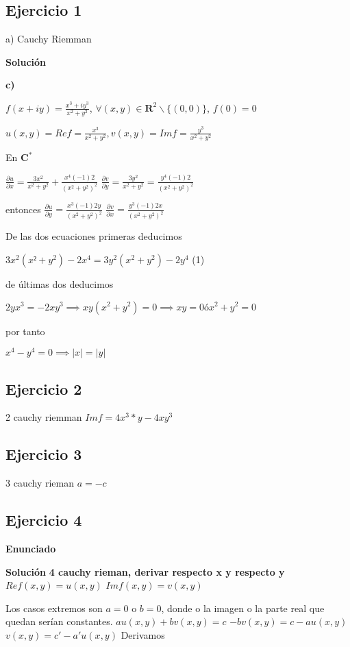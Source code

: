 \subsection{Ejercicio 1}
a) Cauchy Riemman

\textbf{Solución}


\textbf{c)}

$f(x+iy) = \frac{x^3+iy^3}{x^2+y^2}$, $\forall (x,y)\in\mathbf{R}^2 \backslash \{ (0,0) \}$, $f(0)=0$

$u(x,y) = Re f = \frac{x^3}{x^2+y^2}, v(x,y) = Imf = \frac{y^3}{x^2+y^2}$

En $\mathbf{C}^{\ast}$

$ \frac{\partial u}{\partial x} = \frac{3x^2}{x^2+y^2} + \frac{x^4(-1)2}{(x^2+y^2)^2}$
$ \frac{\partial v}{\partial y} = \frac{3y^2}{x^2+y^2} = \frac{y^4(-1)2}{(x^2+y^2)^2}$

entonces
$\frac{\partial u}{\partial y} = \frac{x^3 (-1)2y}{(x^2+y^2)^2}$
$\frac{\partial v}{\partial x} = \frac{y^3(-1)2x}{(x^2+y^2)^2}$

De las dos ecuaciones primeras deducimos

$3x^2(x²+y^2) - 2x^4 = 3y^2(x^2+y^2)-2y^4$  (1)

de últimas dos deducimos

$2yx^3=-2xy^3 \implies xy(x^2+y^2) = 0 \implies xy=0 ó x^2+y^2=0$

por tanto

$x^4-y^4 = 0 \implies |x|=|y|$



\subsection{Ejercicio 2}
2 cauchy riemman
$Imf = 4x^3*y - 4xy^3$

\subsection{Ejercicio 3}
3 cauchy rieman
$a=-c$


\subsection{Ejercicio 4}
\textbf{Enunciado}


\textbf{Solución}
\textbf{4 cauchy rieman, derivar respecto x y respecto y}
$Ref (x,y) = u(x,y)$ $Imf(x,y) = v(x,y)$

Los casos extremos son $a=0$ o $b=0$, donde o la imagen o la parte real que quedan serían constantes.
$au(x,y)+bv(x,y)=c$
$-bv(x,y) = c-au(x,y)$
$v(x,y)= c'-a'u(x,y)$
Derivamos

